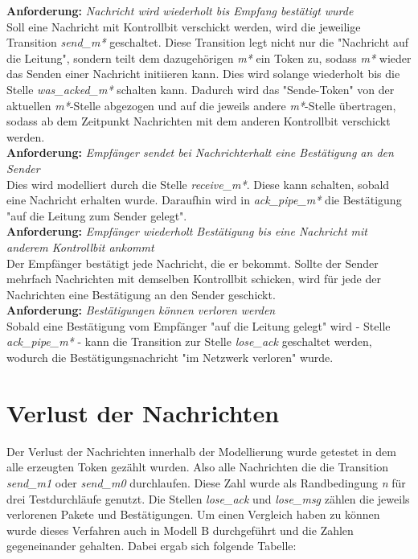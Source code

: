 \documentclass[]{scrartcl}
\begin{document}
\textbf{Anforderung:} \textit{Nachricht wird wiederholt bis Empfang bestätigt wurde} \\
Soll eine Nachricht mit Kontrollbit verschickt werden, wird die jeweilige Transition \textit{send\_m*} geschaltet. Diese Transition legt nicht nur die "Nachricht auf die Leitung", sondern teilt dem dazugehörigen \textit{m*} ein Token zu, sodass \textit{m*} wieder das Senden einer Nachricht initiieren kann. Dies wird solange wiederholt bis die Stelle \textit{was\_acked\_m*} schalten kann. Dadurch wird das "Sende-Token" von der aktuellen \textit{m*}-Stelle abgezogen und auf die jeweils andere \textit{m*}-Stelle übertragen, sodass ab dem Zeitpunkt Nachrichten mit dem anderen Kontrollbit verschickt werden.\\

\textbf{Anforderung:} \textit{Empfänger sendet bei Nachrichterhalt eine Bestätigung an den Sender} \\
Dies wird modelliert durch die Stelle \textit{receive\_m*}. Diese kann schalten, sobald eine Nachricht erhalten wurde. Daraufhin wird in \textit{ack\_pipe\_m*} die Bestätigung "auf die Leitung zum Sender gelegt".\\

\textbf{Anforderung:} \textit{Empfänger wiederholt Bestätigung bis eine Nachricht mit anderem Kontrollbit ankommt} \\
Der Empfänger bestätigt jede Nachricht, die er bekommt. Sollte der Sender mehrfach Nachrichten mit demselben Kontrollbit schicken, wird für jede der Nachrichten eine Bestätigung an den Sender geschickt.\\

\textbf{Anforderung:} \textit{Bestätigungen können verloren werden} \\
Sobald eine Bestätigung vom Empfänger "auf die Leitung gelegt" wird - Stelle \textit{ack\_pipe\_m*} - kann die Transition zur Stelle \textit{lose\_ack} geschaltet werden, wodurch die Bestätigungsnachricht "im Netzwerk verloren" wurde.\\

\section{Verlust der Nachrichten}

Der Verlust der Nachrichten innerhalb der Modellierung wurde getestet in dem alle erzeugten Token gezählt wurden. Also alle Nachrichten die die Transition \textit{send\_m1} oder \textit{send\_m0} durchlaufen. Diese Zahl wurde als Randbedingung \textit{n} für drei Testdurchläufe genutzt. Die Stellen \textit{lose\_ack} und \textit{lose\_msg} zählen die jeweils verlorenen Pakete und Bestätigungen.
Um einen Vergleich haben zu können wurde dieses Verfahren auch in Modell B durchgeführt und die Zahlen gegeneinander gehalten. Dabei ergab sich folgende Tabelle:
\end{document}
